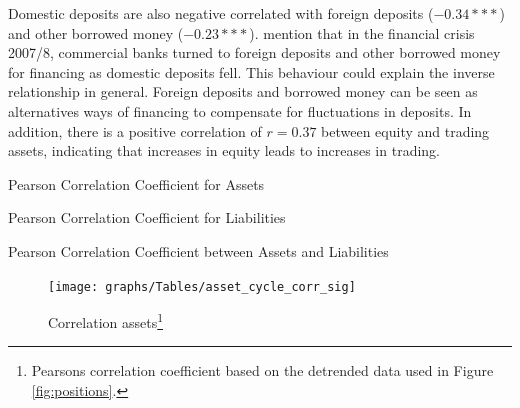 \documentclass[12pt, a4paper]{article} %
\begin{document}
Domestic deposits are also negative correlated with foreign deposits ($-0.34***$) and other borrowed money ($-0.23***$). \cite{bassett2008profits} mention that in the financial crisis 2007/8, commercial banks turned to foreign deposits and other borrowed money for financing as domestic deposits fell. This behaviour could explain the inverse relationship in general. Foreign deposits and borrowed money can be seen as alternatives ways of financing to compensate for fluctuations in deposits.
In addition, there is a positive correlation of $r=0.37$ between equity and trading assets, indicating that increases in equity leads to increases in trading.\\



\begin{table}[H]
\begin{minipage}{\textwidth}
\scriptsize
\hskip-2.0cm

\caption[1]{Pearson Correlation Coefficient for Assets}
\label{tab:corr_assets}
\end{minipage}
\end{table}

\begin{table}[H]
\begin{minipage}{\textwidth}
\scriptsize
\hskip-2.0cm

\caption[1]{Pearson Correlation Coefficient for Liabilities}
\label{tab:corr_liab}
\end{minipage}
\end{table}


\begin{table}[H]
\begin{minipage}{\textwidth}
\scriptsize
\hskip-2.0cm

\caption[1]{Pearson Correlation Coefficient between Assets and Liabilities}
\label{tab:corr_comb}
\end{minipage}
\end{table}

\iffalse
\begin{figure}[H]
\begin{minipage}{\textwidth}
\centering
\caption[1]{Correlation assets\footnote{Pearsons correlation coefficient based on the detrended data used in Figure \ref{fig:positions}.} }
\texttt{[image: graphs/Tables/asset\_cycle\_corr\_sig]}
\label{fig:corr_assets}
\end{minipage}
\end{figure}
\hskip-2.0cm
\end{document}
